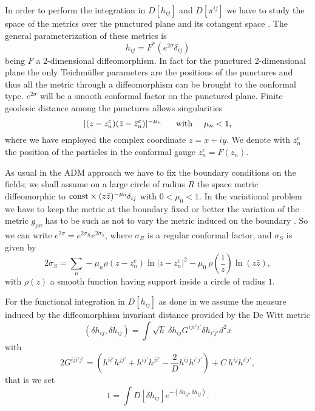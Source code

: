 \documentclass[a4paper,12pt]{article}
\begin{document}
In order to perform the integration in $D[h_{ij}]$ and $D[\pi^{ij}]$
we have to study the space of the metrics over the punctured plane
 and its cotangent space \cite{bers,dhoker}.  The general
parameterization of these metrics is
\begin{equation}
h_{ij} = F^*( e^{2\sigma} \delta_{ij})
\end{equation}
being $F$ a 2-dimensional diffeomorphism.
In 
fact for the punctured 2-dimensional plane the only Teichm\"uller
parameters are the positions of the punctures \cite{bers} and thus all
the metric through a diffeomorphism can be brought to the conformal
type.  $e^{2\sigma}$ will be a smooth conformal factor on the
punctured plane. Finite geodesic distance among the punctures allows
singularities 
\begin{equation}\label{singularities}
[(z-z^c_n)(\bar z-\bar z^c_n)]^{-\mu_n}~~~~{\rm~with}~~~~\mu_n<1,
\end{equation}
where we have employed the complex coordinate $z=x+iy$. We denote with
$z^c_n$ the position of the particles in the conformal gauge
$z^c_n=F(z_n)$.

As usual in the ADM approach \cite{ADM} we have to fix the
boundary conditions on the fields; we shall assume on a large circle
of radius $R$ the space metric diffeomorphic to ${\rm const}\times(z\bar
z)^{-\mu_0}\delta_{ij}$ with $0<\mu_0<1$. In the variational problem we
have to keep the metric at the boundary fixed or better the variation
of the metric $g_{\mu\nu}$ has to be such as not to vary the metric
induced on the boundary \cite{wald}.  So we can write
$e^{2\sigma}=e^{2\sigma_R}e^{2\sigma_S}$, where $\sigma_R$ is a
regular conformal factor, and $\sigma_S$ is given by
\begin{equation}
2\sigma_S =\sum_n -\mu_n \rho(z-z^c_n)\ln|z-z^c_n|^2 - 
\mu_0~\rho(\frac{1}{z})\ln(z\bar z),
\end{equation}
with $\rho(z)$ a smooth function having support inside a
circle of radius $1$.

For the functional integration in $D[h_{ij}]$ as done in
\cite{carlip,alvarez,polchinski} we
assume the measure induced by the diffeomorphism invariant distance provided by
the De Witt metric
\begin{equation}
(\delta h_{ij}, \delta h_{ij}) = \int\sqrt{h}~ \delta h_{ij}
G^{iji'j'}\delta h_{i'j'}d^2x
\end{equation}
with
\begin{equation}
2G^{iji'j'}=(h^{ii'}h^{jj'}+h^{ij'}h^{ji'}-\frac{2}{D}h^{ij}h^{i'j'})+
C~h^{ij}h^{i'j'},
\end{equation}
that is we set
\begin{equation}
1=\int D[\delta h_{ij}] e^{-(\delta h_{ij}, \delta h_{ij})}.
\end{equation}
\end{document}
